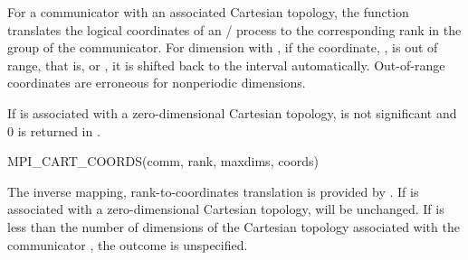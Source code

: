 For a communicator with an associated Cartesian topology, the function
 translates the logical coordinates of an \MPI/ process to
the corresponding rank in the group of the communicator.
For dimension  with , if the coordinate,
, is out of range, that is, \mbox{} or
\mbox{}, it is shifted back to the interval
\mbox{} automatically. Out-of-range
coordinates are erroneous for nonperiodic dimensions.
 
If  is associated with a zero-dimensional Cartesian topology,
 is not significant and 0 is returned in . 

\begin{funcdef}{MPI\_CART\_COORDS}{(\mbox{comm}, \mbox{rank}, \mbox{maxdims}, \mbox{coords})}
\end{funcdef}

The inverse mapping, rank-to-coordinates translation is provided by
.
If  is associated with a zero-dimensional Cartesian topology,
 will be unchanged. 
If  is less than the number of dimensions of the Cartesian topology associated with the communicator , the outcome is unspecified.

